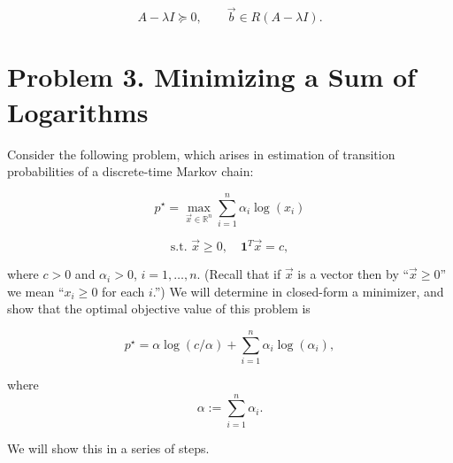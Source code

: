 \documentclass[
	12pt,
]{fphw}
\begin{document}
\[
A-\lambda I\succeq0, \qquad \vec{b}\in R(A-\lambda I).
\]


\newpage
\section*{Problem 3. Minimizing a Sum of Logarithms}

Consider the following problem, which arises in estimation of transition probabilities of a discrete-time Markov chain:

\[
p^\star = \max_{\vec{x}\in\mathbb{R}^n} \sum_{i=1}^n \alpha_i \log(x_i)
\]

\[
\text{s.t. } \vec{x} \ge 0, \quad \mathbf{1}^T \vec{x} = c,
\]

where $c > 0$ and $\alpha_i > 0$, $i = 1, \dots, n$. (Recall that if $\vec{x}$ is a vector then by “$\vec{x} \ge 0$” we mean “$x_i \ge 0$ for each $i$.”) We will determine in closed-form a minimizer, and show that the optimal objective value of this problem is

\[
p^\star = \alpha \log(c/\alpha) + \sum_{i=1}^n \alpha_i \log(\alpha_i),
\]

where
\[
\alpha := \sum_{i=1}^n \alpha_i.
\]

We will show this in a series of steps.
\end{document}
